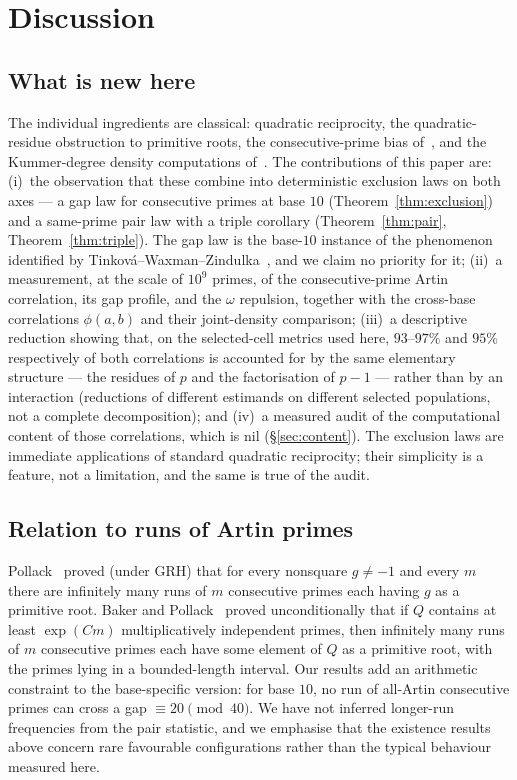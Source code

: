 \section{Discussion}
\label{sec:discussion}

\subsection*{What is new here}
The individual ingredients are classical: quadratic reciprocity, the quadratic-residue
obstruction to primitive roots, the consecutive-prime bias of~\cite{LOS2016}, and the
Kummer-degree density computations of~\cite{Matthews1976,MoreeStevenhagen2014}. The
contributions of this paper are: (i)~the observation that these combine into deterministic
exclusion laws on both axes --- a gap law for consecutive primes at base $10$
(Theorem~\ref{thm:exclusion}) and a same-prime pair law with a triple corollary
(Theorem~\ref{thm:pair}, Theorem~\ref{thm:triple}). The gap law is the base-$10$ instance of
the phenomenon identified by Tinkov\'a--Waxman--Zindulka~\cite{TinkovaWaxmanZindulka2023},
and we claim no priority for it; (ii)~a measurement, at the scale of $10^9$ primes, of the
consecutive-prime Artin correlation, its gap profile, and the $\omega$ repulsion, together
with the cross-base correlations $\phi(a,b)$ and their joint-density comparison; (iii)~a
descriptive reduction showing that, on the selected-cell metrics used here, $93$--$97\%$ and
$95\%$ respectively of both correlations is accounted for by the same elementary structure
--- the residues of $p$ and the factorisation of $p-1$ --- rather than by an interaction
(reductions of different estimands on different selected populations, not a complete
decomposition); and (iv)~a measured audit of the computational content
of those correlations, which is nil (\S\ref{sec:content}). The exclusion laws are immediate
applications of standard quadratic reciprocity; their simplicity is a feature, not a
limitation, and the same is true of the audit.

\subsection*{Relation to runs of Artin primes}
Pollack~\cite{Pollack2014} proved (under GRH) that for every nonsquare $g\neq-1$ and every
$m$ there are infinitely many runs of $m$ consecutive primes each having $g$ as a primitive
root. Baker and Pollack~\cite{BakerPollack2016} proved unconditionally that if $Q$ contains
at least $\exp(Cm)$ multiplicatively independent primes, then infinitely many runs of $m$
consecutive primes each have some element of $Q$ as a primitive root, with the primes lying
in a bounded-length interval. Our results add an arithmetic constraint to the base-specific
version: for base $10$, no run of all-Artin consecutive primes can cross a gap
$\equiv 20 \pmod{40}$. We have not inferred longer-run frequencies from the pair statistic,
and we emphasise that the existence results above concern rare favourable configurations
rather than the typical behaviour measured here.

